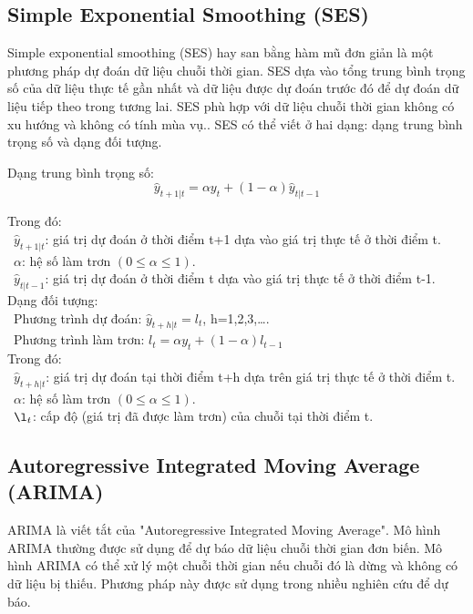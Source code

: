 \documentclass[conference]{IEEEtran}
\begin{document}
\subsection{Simple Exponential Smoothing (SES)}
Simple exponential smoothing (SES) hay san bằng hàm mũ đơn giản là một phương pháp dự đoán dữ liệu chuỗi thời gian. SES dựa vào tổng trung bình trọng số của dữ liệu thực tế gần nhất và dữ liệu được dự đoán trước đó để dự đoán dữ liệu tiếp theo trong tương lai. SES phù hợp với dữ liệu chuỗi thời gian không có xu hướng và không có tính mùa vụ.. SES có thể viết ở hai dạng: dạng trung bình trọng số và dạng đối tượng.

Dạng trung bình trọng số:
\[\hat{y}_{t+1|t} = \alpha y_t + (1-\alpha)\hat{y}_{t|t-1}\]

Trong đó:\\
\indent\textbullet\ \(\hat{y}_{t+1|t} \): giá trị dự đoán ở thời điểm t+1 dựa vào giá trị thực tế ở thời điểm t.\\
\indent\textbullet\ \(\alpha\): hệ số làm trơn \((0\le\alpha\le1)\).\\
\indent\textbullet\ \(\hat{y}_{t|t-1} \): giá trị dự đoán ở thời điểm t dựa vào giá trị thực tế ở thời điểm  t-1.\\

Dạng đối tượng:\\
\indent\textbullet\ Phương trình dự đoán: \(\hat{y}_{t+h|t}=l_t\), h=1,2,3,\dots.\\
\indent\textbullet\ Phương trình làm trơn: \(l_t=\alpha y_t+(1-\alpha)l_{t-1}\)\\

Trong đó:\\
\indent\textbullet\ \(\hat{y}_{t+h|t} \): giá trị dự đoán tại thời điểm t+h dựa trên giá trị thực tế ở thời điểm t.\\
\indent\textbullet\ \(\alpha\): hệ số làm trơn \((0\le\alpha\le1)\).\\
\indent\textbullet\ \(\l_t \): cấp độ (giá trị đã được làm trơn) của chuỗi tại thời điểm t.\\


\subsection{Autoregressive Integrated Moving Average (ARIMA)}

ARIMA là viết tắt của "Autoregressive Integrated Moving Average". Mô hình ARIMA thường được sử dụng để dự báo dữ liệu chuỗi thời gian đơn biến. Mô hình ARIMA có thể xử lý một chuỗi thời gian nếu chuỗi đó là dừng và không có dữ liệu bị thiếu. Phương pháp này được sử dụng trong nhiều nghiên cứu để dự báo.
\end{document}
